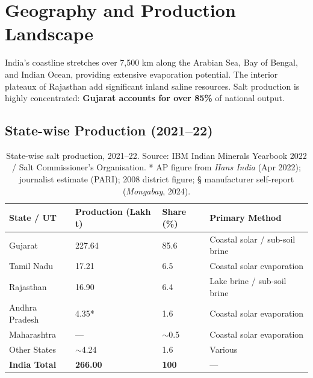 \documentclass[12pt,a4paper]{article}
\begin{document}
\section{Geography and Production Landscape}

India's coastline stretches over 7,500 km along the Arabian Sea, Bay of Bengal, and
Indian Ocean, providing extensive evaporation potential. The interior plateaux of
Rajasthan add significant inland saline resources. Salt production is highly
concentrated: \textbf{Gujarat accounts for over 85\%} of national output.

\subsection{State-wise Production (2021--22)}

\begin{table}[H]
\centering
\caption{State-wise salt production, 2021--22.
Source: IBM Indian Minerals Yearbook 2022 / Salt Commissioner's Organisation.
* AP figure from \textit{Hans India} (Apr 2022); \dag{} journalist estimate (PARI);
\ddag{} 2008 district figure; \S{} manufacturer self-report (\textit{Mongabay}, 2024).}
\smallskip
\begin{tabular}{L{4.5cm} C{2.8cm} C{1.8cm} L{5cm}}
\toprule
{}
\color{white}\textbf{State / UT} &
\color{white}\textbf{Production (Lakh t)} &
\color{white}\textbf{Share (\%)} &
\color{white}\textbf{Primary Method} \\
\midrule
Gujarat & 227.64 & 85.6 & Coastal solar / sub-soil brine \\
Tamil Nadu & 17.21 & 6.5 & Coastal solar evaporation \\
Rajasthan & 16.90 & 6.4 & Lake brine / sub-soil brine \\
Andhra Pradesh & 4.35* & 1.6 & Coastal solar evaporation \\
Maharashtra & --- & $\sim$0.5 & Coastal solar evaporation \\
Other States & $\sim$4.24 & 1.6 & Various \\
\midrule
\textbf{India Total} & \textbf{266.00} & \textbf{100} & --- \\
\bottomrule
\end{tabular}
\end{table}
\end{document}
